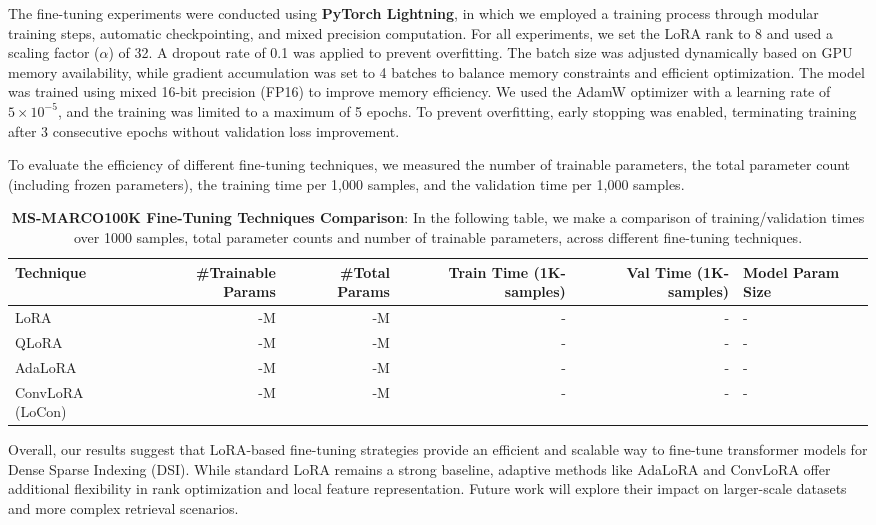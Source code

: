 The fine-tuning experiments were conducted using \textbf{PyTorch Lightning}, in which we employed a training process through modular training steps, automatic checkpointing, and mixed precision computation. For all experiments, we set the LoRA rank to 8 and used a scaling factor (\(\alpha\)) of 32. A dropout rate of 0.1 was applied to prevent overfitting. The batch size was adjusted dynamically based on GPU memory availability, while gradient accumulation was set to 4 batches to balance memory constraints and efficient optimization. The model was trained using mixed 16-bit precision (FP16) to improve memory efficiency. We used the AdamW optimizer with a learning rate of \(5 \times 10^{-5}\), and the training was limited to a maximum of 5 epochs. To prevent overfitting, early stopping was enabled, terminating training after 3 consecutive epochs without validation loss improvement. 

To evaluate the efficiency of different fine-tuning techniques, we measured the number of trainable parameters, the total parameter count (including frozen parameters), the training time per 1,000 samples, and the validation time per 1,000 samples.

\begin{table*}[ht]
    \centering
    \begin{tabular}{lrrrr}
    \toprule
    \textbf{Technique} & \textbf{\#Trainable Params} & \textbf{\#Total Params} & \textbf{Train Time (1K-samples)} & \textbf{Val Time (1K-samples)} & \textbf{Model Param Size} \\
    \midrule
    LoRA            & -M & -M & - & - & - \\
    QLoRA           & -M & -M & - & - & - \\
    AdaLoRA         & -M & -M & - & - & - \\
    ConvLoRA (LoCon)& -M & -M & - & - & - \\
    \bottomrule
    \end{tabular}
    \caption{\textbf{MS-MARCO100K Fine-Tuning Techniques Comparison}: In the following table, we make a comparison of training/validation times over 1000 samples, total parameter counts and number of trainable parameters, across different fine-tuning techniques.}
    \label{tab:results_comparison}
\end{table*}

Overall, our results suggest that LoRA-based fine-tuning strategies provide an efficient and scalable way to fine-tune transformer models for Dense Sparse Indexing (DSI). While standard LoRA remains a strong baseline, adaptive methods like AdaLoRA and ConvLoRA offer additional flexibility in rank optimization and local feature representation. Future work will explore their impact on larger-scale datasets and more complex retrieval scenarios.

